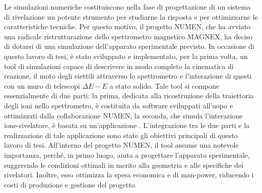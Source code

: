 

Le simulazioni numeriche costituiscono nella fase di progettazione di un sistema di rivelazione un potente strumento per studiarne la risposta e per ottimizzarne le caratteristiche tecniche.
Per questo motivo, il progetto NUMEN, che ha avviato una radicale ristrutturazione dello spettrometro magnetico MAGNEX, ha deciso di dotarsi di una simulazione dell'apparato sperimentale previsto.
In occasione di questo lavoro di tesi, è stato sviluppato e implementato, per la prima volta, un tool di simulazioni capace di descrivere in modo completo la cinematica di reazione, il moto degli eiettili attraverso lo spettrometro e l'interazione di questi con un muro di telescopi $\Delta E - E$ a stato solido.
%
Tale tool si compone essenzialmente di due parti: la prima, dedicata alla ricostruzione della traiettoria degli ioni nello spettrometro, è costituita da software sviluppati all'uopo e ottimizzati dalla collaborazione NUMEN, la seconda, che simula l'interazione ione-rivelatore, è basata su un'applicazione \geant.
L'integrazione tra le due parti e la realizzazione di tale applicazione sono state gli obiettivi principali di questo lavoro di tesi.
All'interno del progetto NUMEN, il tool assume una notevole importanza, perché, in primo luogo, aiuta a progettare l'apparato sperimentale, suggerendo le condizioni ottimali in merito alla geometria e alle specifiche dei rivelatori. 
Inoltre, esso ottimizza la spesa economica e di man-power, riducendo i costi di produzione e gestione del progetto.

